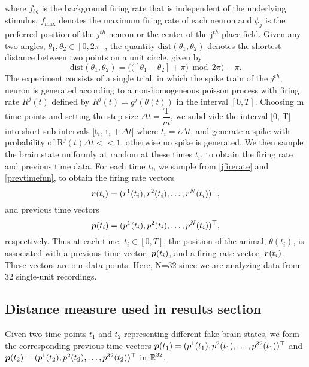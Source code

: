 where $f_{bg}$ is the background firing rate that is independent of the underlying stimulus, $f_{\max}$ denotes the maximum firing rate of each 
neuron and $\phi_{j}$ is the preferred position of the $j^{th}$ 
neuron or the center of the j$^{th}$ place field.
Given any two angles, $\theta_{1}, \theta_{2} \in [0, 2\pi]$, the quantity
$\text{dist}(\theta_{1}, \theta_{2})$ denotes the shortest distance between 
two points on a unit circle, given by
\[
\text{dist}(\theta_{1}, \theta_{2}) = \big( \big( [\theta_{1} - \theta_{2}] + \pi  \big) \ \ \text{mod} \ \ 2\pi \big) - \pi.
\]
The experiment consists of a single trial, in which the spike train of the $j^{th}$, neuron is generated according to a non-homogeneous poisson process with firing rate $R^{j}(t)$ defined by $R^{j}(t) = g^{j}(\theta(t))$ in the interval $[0, T]$. Choosing m time points and setting the step size $\Delta t = \dfrac{\text{T}}{m}$, we subdivide the interval [0, T] into short sub intervals [t$_{i}$, t$_{i} + \Delta t$] where $t_{i} = i \Delta t$, and generate
a spike with probability of $\text{R}^{j}(t)\Delta t << 1$, otherwise no spike is generated.  We then sample the brain state uniformly at random at these times $t_{i}$, to obtain the firing rate and previous time data. For each time $t_{i}$, we sample from  \eqref{jfirerate} and  \eqref{prevtimefun}, to obtain the firing rate vectors 
\[ \boldsymbol{r}(t_{i}) = (r^{1}(t_{i}), r^{2}(t_{i}), \ldots, r^{N}(t_{i}))^{\top},
\]
and previous time vectors
\[
\boldsymbol{p}(t_{i}) = (p^{1}(t_{i}), p^{2}(t_{i}), \ldots, p^{N}(t_{i}))^{\top},
\] respectively.
Thus at each time, $t_{i} \in [0,T]$, the position of the animal, $\theta(t_{i})$, is associated with a previous time vector, $\boldsymbol{p}(t_{i})$,
and a firing rate vector, $\boldsymbol{r}(t_{i})$.
These vectors are our data points.  Here, N=32 since we are analyzing data from 32 single-unit recordings. 



\subsection{Distance measure used in results section}
Given two time points $t_{1}$ and $t_{2}$ representing different fake brain states, we form the corresponding previous time vectors $\boldsymbol{p}(t_{1})= (p^{1}(t_{1}), p^{2}(t_{1}), \ldots, p^{32}(t_{1}))^{\top} $  and  $\boldsymbol{p}(t_{2}) = (p^{1}(t_{2}), p^{2}(t_{2}), \ldots, p^{32}(t_{2}))^{\top}$ in $\operatorname{\mathbb{R}}^{32}$.

